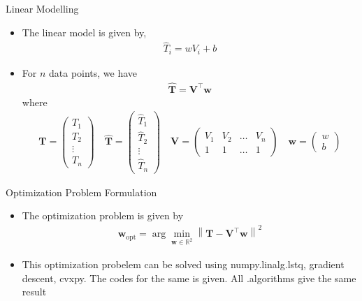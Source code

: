 \documentclass[10pt]{beamer}
\renewcommand{\vec}[1]{\boldsymbol{\mathbf{#1}}}
\newcommand{\myvec}[1]{\ensuremath{\begin{pmatrix}#1\end{pmatrix}}}
\providecommand{\norm}[1]{\left\lVert#1\right\rVert}
\begin{document}
\begin{frame}{Linear Modelling}
\begin{itemize}
\item The linear model is given by,
\begin{align}
	\hat{T}_{i} = w V_i + b
\end{align}
	\item For $n$ data points, we have
	\begin{align}
	\vec{\hat{T}} = \vec{V}^{\top}\vec{w}
	\end{align}
	where
	\begin{align}
		\vec{T} = \myvec{T_1 \\ T_2 \\ \vdots\\ T_n} \quad 
	\vec{\hat{T}} = \myvec{\hat{T}_{1} \\ \hat{T}_{2} \\ \vdots\\ \hat{T}_{n}} \quad
	\vec{V} = \myvec{V_1  & V_2 &  \ldots & V_n \\ 1 & 1 & \ldots &1}
	\quad
	\vec{w} = \myvec{w \\ b}
	\end{align}
\end{itemize}

\end{frame}

\begin{frame}{Optimization Problem Formulation}
\begin{itemize}

\item The optimization problem is given by
	\begin{align}
		\vec{w}_\text{opt} =  \arg\min_{\vec{w} \in \mathbb{R}^2}  \norm{\vec{T} - \vec{V}^{\top}\vec{w}}^2
	\end{align}
\item This optimization probelem can be solved using numpy.linalg.lstq, gradient descent, cvxpy. The codes for the same is given. All .algorithms give the same result
\end{itemize}
\end{frame}
\end{document}

